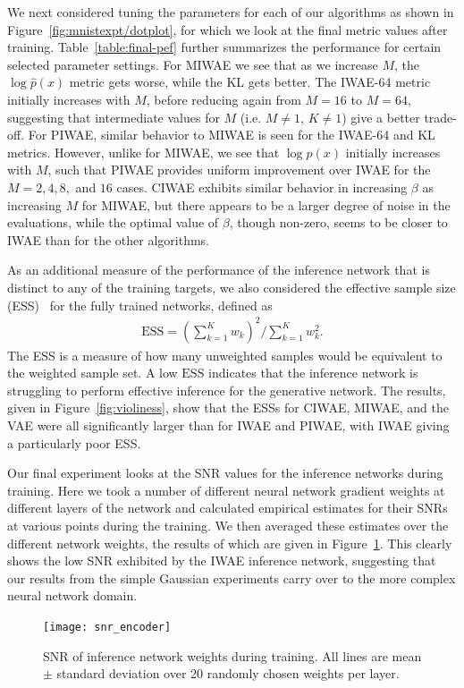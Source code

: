 We next considered tuning the parameters for each of
our algorithms as shown in Figure~\ref{fig:mnistexpt/dotplot}, for
which we look at the final metric values after training.
Table~\ref{table:final-pef} further summarizes the performance
for certain selected parameter settings. For \gls{MIWAE} we see that as we increase $M$, 
the $\log \hat{p}(x)$ metric gets worse, while the \textsc{KL}
gets better.  The \gls{IWAE}-64  metric initially increases with $M$, before reducing
again from $M=16$ to $M=64$, suggesting that intermediate
values for $M$ (i.e. $M\neq1$, $K\neq1$) give a better trade-off.  For \gls{PIWAE}, similar
behavior to \gls{MIWAE} is seen for the \gls{IWAE}-64 
and \textsc{KL} metrics.  However, unlike for \gls{MIWAE}, we see that 
$\log \hat{p}(x)$ initially increases with $M$, such that 
\gls{PIWAE} provides uniform improvement over \gls{IWAE}
for the $M=2,4,8,$ and $16$ cases.  
\gls{CIWAE} exhibits similar behavior in increasing $\beta$
as increasing $M$ for \gls{MIWAE}, but there appears to
be a larger degree of noise in the evaluations, while the optimal
value of $\beta$, though non-zero, seems to be closer
to \gls{IWAE} than for the other algorithms.

As an additional measure of the performance of the inference
network that is distinct to any of the training targets, 
we also considered the effective sample size (ESS)~\cite{mcbook}
for the fully trained networks, defined as
\begin{align}
\text{ESS} = (\textstyle \sum_{k=1}^K w_k)^2 / \textstyle \sum_{k=1}^K w_k^2.
\end{align}
The ESS is a measure of how many unweighted samples would be equivalent
to the weighted sample set.  
A low $\text{ESS}$ indicates that the inference network is struggling to
perform effective inference for the generative network.
The results, given in Figure~\ref{fig:violiness}, show that the
ESSs for \gls{CIWAE}, \gls{MIWAE}, and the \gls{VAE} were
all significantly larger than for \gls{IWAE} and \gls{PIWAE},
with \gls{IWAE} giving a particularly poor ESS.

Our final experiment looks at the \gls{SNR} values for the 
inference networks during training.  Here we took a number of different neural network gradient weights
at different layers of the network and calculated empirical estimates
for their \gls{SNR}s at various points during the training.  We then
averaged these estimates over the different network weights, the 
results of which are given in Figure~\ref{fig:inferencesnr}.  This
clearly shows the low \gls{SNR} exhibited by the \gls{IWAE}
inference network, suggesting that our results from the simple
Gaussian experiments carry over to the more complex neural network
domain.

 


\begin{figure}[t!]
	\centering
	\texttt{[image: snr\_encoder]}\vspace{-9pt}
	\caption{\gls{SNR} of inference network weights during training. All lines are mean $\pm$ standard deviation over 20 randomly chosen weights per layer.
		\vspace{-12pt} \label{fig:inferencesnr}}
\end{figure}

